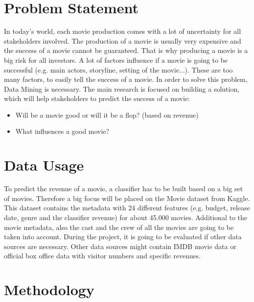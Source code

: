 

 
\section{Problem Statement}
 In today's world, each movie production comes with a lot of uncertainty for all stakeholders involved. The production of a movie is usually very expensive and the success of a movie cannot be guaranteed. That is why producing a movie is a big risk for all investors. 
A lot of factors influence if a movie is going to be successful (e.g. main actors, storyline, setting of the movie...). These are too many factors, to easily tell the success of a movie. In order to solve this problem, Data Mining is necessary. 
The main research is focused on building a solution, which will help stakeholders to predict the success of a movie:

\begin{itemize}
    \item Will be a movie good or will it be a flop?  (based on revenue)
    \item What influences a good movie?
\end{itemize}


\section{Data Usage}
To predict the revenue of a movie, a classifier has to be built based on a big set of movies. Therefore a big focus will be placed on the Movie dataset from Kaggle. This dataset contains the metadata with 24 different features (e.g. budget, release date, genre and the classifier revenue) for about 45.000 movies. Additional to the movie metadata, also the cast and the crew of all the movies are going to be taken into account. During the project, it is going to be evaluated if other data sources are necessary. Other data sources might contain IMDB movie data or official box office data with visitor numbers and specific revenues.



\section{Methodology}

